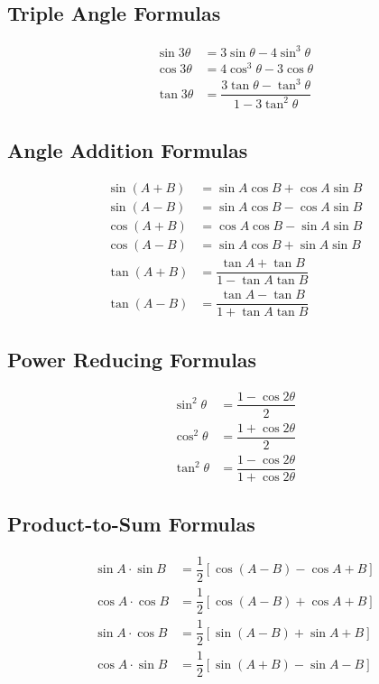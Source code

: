 \documentclass{article}
\begin{document}
	
	
	\subsection{Triple Angle Formulas}		
	\begin{align*}
		\sin{3\theta} &= 3\sin{\theta} - 4 \sin^3{\theta} \\
		\cos{3\theta} &= 4 \cos^3{\theta} - 3\cos{\theta} \\
		\tan{3\theta} &= \dfrac{3\tan{\theta} - \tan^3{\theta}}{1 - 3 \tan^2{\theta}}
	\end{align*}
	
	
	\subsection{Angle Addition Formulas}	
	\begin{align*}
		\sin{(A + B)} &= \sin{A} \cos{B} + \cos{A}\sin{B}\\
		\sin{(A - B)} &= \sin{A} \cos{B} - \cos{A}\sin{B}\\
		\cos{(A + B)} &= \cos{A} \cos{B} - \sin{A}\sin{B}\\
		\cos{(A - B)} &= \sin{A} \cos{B} + \sin{A}\sin{B}\\		
		\tan{(A + B)} &= \dfrac{\tan{A} + \tan{B}}{1 - \tan{A}\tan{B}}\\
		\tan{(A - B)} &= \dfrac{\tan{A} - \tan{B}}{1 + \tan{A}\tan{B}}
	\end{align*}
	
	
	
	
	\subsection{Power Reducing Formulas}
	\begin{align*}
		\sin^2{\theta} &= \dfrac{1 - \cos{2\theta}}{2}\\
		\cos^2{\theta} &= \dfrac{1 + \cos{2\theta}}{2}\\
		\tan^2{\theta} &= \dfrac{1 - \cos{2\theta}}{1 + \cos{2\theta}}
	\end{align*}
	
	
	\subsection{Product-to-Sum Formulas}	
	\begin{align*}
		\sin{A} \cdot \sin{B} &= \dfrac{1}{2} \left[ \cos{(A - B)} - \cos{A + B}  \right]\\
		\cos{A} \cdot \cos{B} &= \dfrac{1}{2} \left[ \cos{(A - B)} + \cos{A + B}  \right]\\
		\sin{A} \cdot \cos{B} &= \dfrac{1}{2} \left[ \sin{(A - B)} + \sin{A + B}  \right]\\
		\cos{A} \cdot \sin{B} &= \dfrac{1}{2} \left[ \sin{(A + B)} - \sin{A - B}  \right]
	\end{align*}
	
\end{document}

